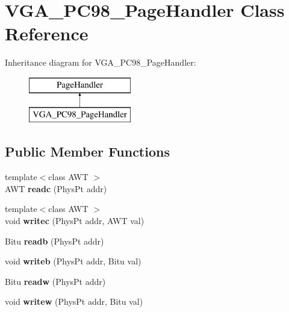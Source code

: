 \hypertarget{classVGA__PC98__PageHandler}{\section{V\-G\-A\-\_\-\-P\-C98\-\_\-\-Page\-Handler Class Reference}
\label{classVGA__PC98__PageHandler}
}
Inheritance diagram for V\-G\-A\-\_\-\-P\-C98\-\_\-\-Page\-Handler\-:\begin{figure}[H]
\begin{center}
\leavevmode
\includegraphics[height=2.000000cm]{classVGA__PC98__PageHandler}
\end{center}
\end{figure}
\subsection*{Public Member Functions}
\begin{DoxyCompactItemize}
\item 
\hypertarget{classVGA__PC98__PageHandler_aeb70f364aa5ef8ea40607625b7786e9f}{{\footnotesize template$<$class A\-W\-T $>$ }\\A\-W\-T {\bfseries readc} (Phys\-Pt addr)}\label{classVGA__PC98__PageHandler_aeb70f364aa5ef8ea40607625b7786e9f}

\item 
\hypertarget{classVGA__PC98__PageHandler_a4e6b6c2642bd7e3167898f6202428929}{{\footnotesize template$<$class A\-W\-T $>$ }\\void {\bfseries writec} (Phys\-Pt addr, A\-W\-T val)}\label{classVGA__PC98__PageHandler_a4e6b6c2642bd7e3167898f6202428929}

\item 
\hypertarget{classVGA__PC98__PageHandler_aa1c636ed24e234e6f2e0a572f22398f3}{Bitu {\bfseries readb} (Phys\-Pt addr)}\label{classVGA__PC98__PageHandler_aa1c636ed24e234e6f2e0a572f22398f3}

\item 
\hypertarget{classVGA__PC98__PageHandler_a3f5d246269852181567478c7fcc28ad4}{void {\bfseries writeb} (Phys\-Pt addr, Bitu val)}\label{classVGA__PC98__PageHandler_a3f5d246269852181567478c7fcc28ad4}

\item 
\hypertarget{classVGA__PC98__PageHandler_a8aeb975c81dbdeb7cabc51f0a6ba3824}{Bitu {\bfseries readw} (Phys\-Pt addr)}\label{classVGA__PC98__PageHandler_a8aeb975c81dbdeb7cabc51f0a6ba3824}

\item 
\hypertarget{classVGA__PC98__PageHandler_a43994b81eda37033f18a44fc8e5efa4f}{void {\bfseries writew} (Phys\-Pt addr, Bitu val)}\label{classVGA__PC98__PageHandler_a43994b81eda37033f18a44fc8e5efa4f}

\end{DoxyCompactItemize}
